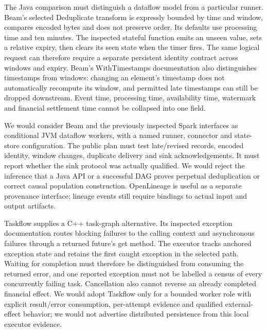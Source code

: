 The Java comparison must distinguish a dataflow model from a particular runner. Beam's selected Deduplicate transform is expressly bounded by time and window, compares encoded bytes and does not preserve order. Its defaults use processing time and ten minutes. The inspected stateful function emits an unseen value, sets a relative expiry, then clears its seen state when the timer fires. The same logical request can therefore require a separate persistent identity contract across windows and expiry. Beam's WithTimestamps documentation also distinguishes timestamps from windows: changing an element's timestamp does not automatically recompute its window, and permitted late timestamps can still be dropped downstream. Event time, processing time, availability time, watermark and financial settlement time cannot be collapsed into one field.\citep{exec25_dww_beam}

We would consider Beam and the previously inspected Spark interfaces as conditional JVM dataflow workers, with a named runner, connector and state-store configuration. The public plan must test late/revised records, encoded identity, window changes, duplicate delivery and sink acknowledgements. It must report whether the sink protocol was actually qualified. We would reject the inference that a Java API or a successful DAG proves perpetual deduplication or correct causal population construction. OpenLineage is useful as a separate provenance interface; lineage events still require bindings to actual input and output artifacts.\citep{exec25_otm_spark,exec24_openlineage_source,exec24_openlineage_reference,exec25_dww_choice}

Taskflow supplies a C++ task-graph alternative. Its inspected exception documentation routes blocking failures to the calling context and asynchronous failures through a returned future's get method. The executor tracks anchored exception state and retains the first caught exception in the selected path. Waiting for completion must therefore be distinguished from consuming the returned error, and one reported exception must not be labelled a census of every concurrently failing task. Cancellation also cannot reverse an already completed financial effect. We would adopt Taskflow only for a bounded worker role with explicit result/error consumption, per-attempt evidence and qualified external-effect behavior; we would not advertise distributed persistence from this local executor evidence.\citep{exec25_dww_taskflow}

